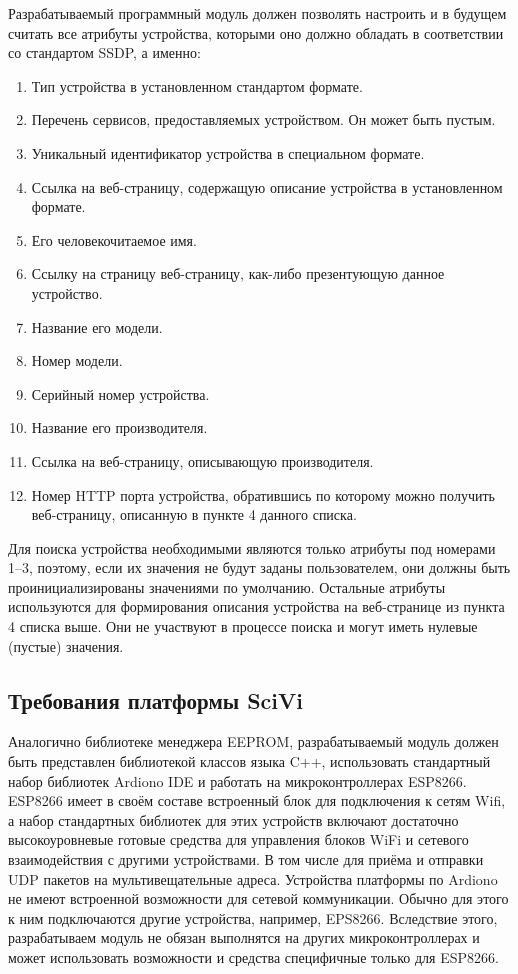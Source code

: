 Разрабатываемый программный модуль должен позволять настроить и в будущем считать все атрибуты устройства, которыми оно должно обладать в соответствии со стандартом SSDP, а именно:
\begin{enumerate}
	\item Тип устройства в установленном стандартом формате.
	\item Перечень сервисов, предоставляемых устройством.
	Он может быть пустым.
	\item Уникальный идентификатор устройства в специальном формате.
	\item Ссылка на веб-страницу, содержащую описание устройства в установленном формате.
	\item Его человекочитаемое имя.
	\item Ссылку на страницу веб-страницу, как-либо презентующую данное устройство.
	\item Название его модели.
	\item Номер модели.
	\item Серийный номер устройства.
	\item Название его производителя.
	\item Ссылка на веб-страницу, описывающую производителя.
	\item Номер HTTP порта устройства, обратившись по которому можно получить веб-страницу, описанную в пункте 4 данного списка.
\end{enumerate}

Для поиска устройства необходимыми являются только атрибуты под номерами 1--3, поэтому, если их значения не будут заданы пользователем, они должны быть проинициализированы значениями по умолчанию.
Остальные атрибуты используются для формирования описания устройства на веб-странице из пункта 4 списка выше.
Они не участвуют в процессе поиска и могут иметь нулевые (пустые) значения.

\subsection{Требования платформы SciVi}

Аналогично библиотеке менеджера EEPROM, разрабатываемый модуль должен быть представлен библиотекой классов языка C++, использовать стандартный набор библиотек Ardiono IDE и работать на микроконтроллерах ESP8266.
ESP8266 имеет в своём составе встроенный блок для подключения к сетям Wifi, а набор стандартных библиотек для этих устройств включают достаточно высокоуровневые готовые средства для управления блоков WiFi и сетевого взаимодействия с другими устройствами.
В том числе для приёма и отправки UDP пакетов на мультивещательные адреса.
Устройства платформы по Ardiono не имеют встроенной возможности для сетевой коммуникации.
Обычно для этого к ним подключаются другие устройства, например, EPS8266.
Вследствие этого, разрабатываем модуль не обязан выполнятся на других микроконтроллерах и может использовать возможности и средства специфичные только для ESP8266.

